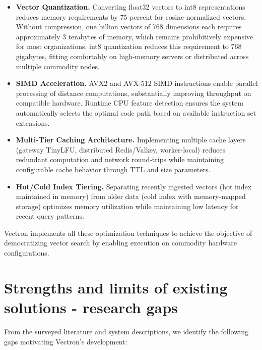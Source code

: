 \begin{itemize}
    \item \textbf{Vector Quantization.} Converting float32 vectors to int8 representations reduces memory requirements by 75 percent for cosine-normalized vectors. Without compression, one billion vectors of 768 dimensions each requires approximately 3 terabytes of memory, which remains prohibitively expensive for most organizations. int8 quantization reduces this requirement to 768 gigabytes, fitting comfortably on high-memory servers or distributed across multiple commodity nodes.
    
    \item \textbf{SIMD Acceleration.} AVX2 and AVX-512 SIMD instructions enable parallel processing of distance computations, substantially improving throughput on compatible hardware. Runtime CPU feature detection ensures the system automatically selects the optimal code path based on available instruction set extensions.
    
    \item \textbf{Multi-Tier Caching Architecture.} Implementing multiple cache layers (gateway TinyLFU, distributed Redis/Valkey, worker-local) reduces redundant computation and network round-trips while maintaining configurable cache behavior through TTL and size parameters.
    
    \item \textbf{Hot/Cold Index Tiering.} Separating recently ingested vectors (hot index maintained in memory) from older data (cold index with memory-mapped storage) optimizes memory utilization while maintaining low latency for recent query patterns.
\end{itemize}

Vectron implements all these optimization techniques to achieve the objective of democratizing vector search by enabling execution on commodity hardware configurations.

\section{Strengths and limits of existing solutions - research gaps}
From the surveyed literature and system descriptions, we identify the following gaps motivating Vectron's development:

